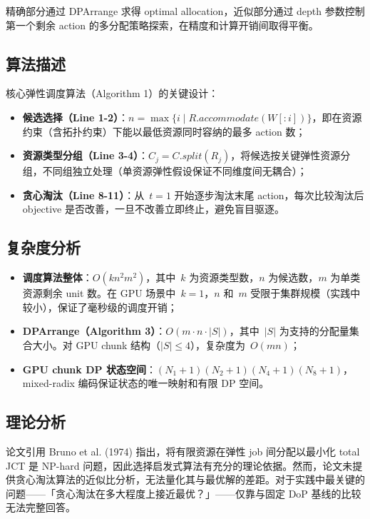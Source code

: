 \documentclass[11pt, a4paper]{article}
\begin{document}
精确部分通过 DPArrange 求得 optimal allocation，近似部分通过 depth 参数控制第一个剩余 action 的多分配策略探索，在精度和计算开销间取得平衡。

\subsection{算法描述}

核心弹性调度算法（Algorithm 1）的关键设计：

\begin{itemize}
  \item \textbf{候选选择（Line 1-2）}：$n = \max\{i \mid R.\mathit{accommodate}(W[:i])\}$，即在资源约束（含拓扑约束）下能以最低资源同时容纳的最多 action 数；
  \item \textbf{资源类型分组（Line 3-4）}：$C_j = C.\mathit{split}(R_j)$，将候选按关键弹性资源分组，不同组独立处理（单资源弹性假设保证不同维度间无耦合）；
  \item \textbf{贪心淘汰（Line 8-11）}：从~$t=1$ 开始逐步淘汰末尾 action，每次比较淘汰后 objective 是否改善，一旦不改善立即终止，避免盲目驱逐。
\end{itemize}

\subsection{复杂度分析}

\begin{itemize}
  \item \textbf{调度算法整体}：$O(kn^2m^2)$，其中~$k$ 为资源类型数，$n$ 为候选数，$m$ 为单类资源剩余 unit 数。在 GPU 场景中~$k=1$，$n$ 和~$m$ 受限于集群规模（实践中较小），保证了毫秒级的调度开销；
  \item \textbf{DPArrange（Algorithm 3）}：$O(m \cdot n \cdot |S|)$，其中~$|S|$ 为支持的分配量集合大小。对 GPU chunk 结构（$|S| \leq 4$），复杂度为~$O(mn)$；
  \item \textbf{GPU chunk DP 状态空间}：$(N_1+1)(N_2+1)(N_4+1)(N_8+1)$，mixed-radix 编码保证状态的唯一映射和有限 DP 空间。
\end{itemize}

\subsection{理论分析}

论文引用 Bruno et al. (1974) 指出，将有限资源在弹性 job 间分配以最小化 total JCT 是 NP-hard 问题，因此选择启发式算法有充分的理论依据。然而，论文未提供贪心淘汰算法的近似比分析，无法量化其与最优解的差距。对于实践中最关键的问题——「贪心淘汰在多大程度上接近最优？」——仅靠与固定 DoP 基线的比较无法完整回答。
\end{document}
